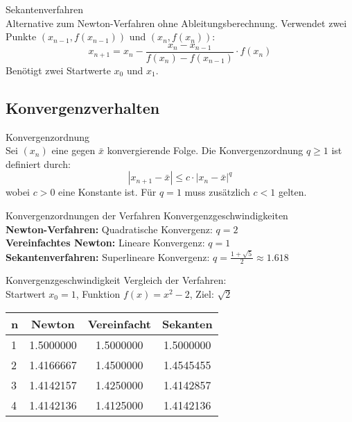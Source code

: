 \begin{concept}{Sekantenverfahren}\\
    Alternative zum Newton-Verfahren ohne Ableitungsberechnung. Verwendet zwei Punkte $(x_{n-1}, f(x_{n-1}))$ und $(x_n, f(x_n))$:
    $$x_{n+1} = x_n - \frac{x_n-x_{n-1}}{f(x_n)-f(x_{n-1})} \cdot f(x_n)$$
    Benötigt zwei Startwerte $x_0$ und $x_1$.
\end{concept}

\subsection{Konvergenzverhalten}

\begin{definition}{Konvergenzordnung}\\
    Sei $(x_n)$ eine gegen $\bar{x}$ konvergierende Folge. Die Konvergenzordnung $q \geq 1$ ist definiert durch:
    $$|x_{n+1}-\bar{x}| \leq c \cdot |x_n-\bar{x}|^q$$
    wobei $c > 0$ eine Konstante ist. Für $q = 1$ muss zusätzlich $c < 1$ gelten.
\end{definition}

\begin{theorem}{Konvergenzordnungen der Verfahren} Konvergenzgeschwindigkeiten
    \vspace{-2mm}\\
    \textbf{Newton-Verfahren:} Quadratische Konvergenz: $q = 2$
    \vspace{1mm}\\
    \textbf{Vereinfachtes Newton:} Lineare Konvergenz: $q = 1$
    \vspace{1mm}\\
    \textbf{Sekantenverfahren:} Superlineare Konvergenz: $q = \frac{1+\sqrt{5}}{2} \approx 1.618$
\end{theorem}

\begin{example2}{Konvergenzgeschwindigkeit} Vergleich der Verfahren:
    \vspace{1mm}\\
    Startwert $x_0 = 1$, Funktion $f(x) = x^2 - 2$, Ziel: $\sqrt{2}$
    \begin{center}
    \begin{tabular}{l|c|c|c}
    n & Newton & Vereinfacht & Sekanten \\\hline
    1 & 1.5000000 & 1.5000000 & 1.5000000\\
    2 & 1.4166667 & 1.4500000 & 1.4545455\\
    3 & 1.4142157 & 1.4250000 & 1.4142857\\
    4 & 1.4142136 & 1.4125000 & 1.4142136
    \end{tabular}
    \end{center}
\end{example2}


